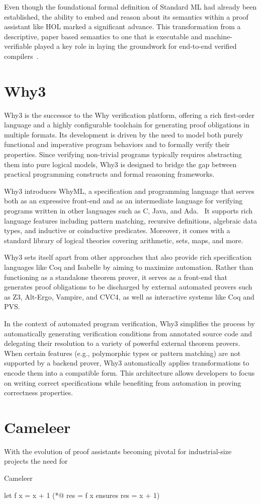 Even though the foundational formal definition of Standard ML had already been established, the ability to embed and 
reason about its semantics within a proof assistant like HOL marked a significant advance. This transformation from a 
descriptive, paper based semantics to one that is executable and machine-verifiable played a key role in laying the 
groundwork for end-to-end verified compilers~\cite{Syme93}.

\section{Why3}
\label{sec:Why3}

Why3 is the successor to the Why verification platform, offering a rich first-order language and a highly configurable 
toolchain for generating proof obligations in multiple formats. Its development is driven by the need to model both purely 
functional and imperative program behaviors and to formally verify their properties. Since verifying non-trivial programs 
typically requires abstracting them into pure logical models, Why3 is designed to bridge the gap between practical programming 
constructs and formal reasoning frameworks.

Why3 introduces \textsf{WhyML}, a specification and programming language that serves both as an expressive front-end and as 
an intermediate language for verifying programs written in other languages such as C, Java, and Ada.~\cite{FilliatreP13} 
It supports rich language features including pattern matching, recursive definitions, algebraic data types, and inductive or 
coinductive predicates. Moreover, it comes with a standard library of logical theories covering arithmetic, sets, maps, 
and more.

Why3 sets itself apart from other approaches that also provide rich specification languages like \textsf{Coq} and 
\textsf{Isabelle} by aiming to maximize automation. Rather than functioning as a standalone theorem prover, it serves 
as a front-end that generates proof obligations to be discharged by external automated provers such as Z3, Alt-Ergo, 
Vampire, and CVC4, as well as interactive systems like Coq and PVS.

In the context of automated program verification, Why3 simplifies the process by automatically generating verification 
conditions from annotated source code and delegating their resolution to a variety of powerful external theorem provers. 
When certain features (e.g., polymorphic types or pattern matching) are not supported by a backend prover, Why3 automatically 
applies transformations to encode them into a compatible form. This architecture allows developers to focus on writing 
correct specifications while benefiting from automation in proving correctness properties.~\cite{boogie11why3}


\section{Cameleer}
\label{sec:Cameleer}

With the evolution of proof assistants becoming pivotal for industrial-size projects the need for 

Cameleer ~\cite{PereiraR20}

\begin{gospell}
  let f x = x + 1 (*@ res = f x ensures res = x + 1)
\end{gospell}